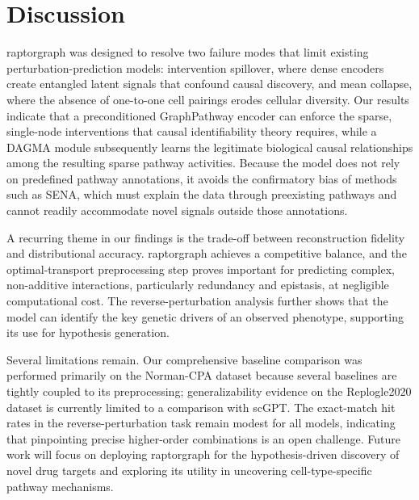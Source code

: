 \documentclass[10pt,letterpaper]{article}
\theoremstyle{definition}
\theoremstyle{remark}
\begin{document}
\section*{Discussion}
\gls{raptorgraph} was designed to resolve two failure modes that limit existing perturbation-prediction models: intervention spillover, where dense encoders create entangled latent signals that confound causal discovery, and mean collapse, where the absence of one-to-one cell pairings erodes cellular diversity.
Our results indicate that a preconditioned GraphPathway encoder can enforce the sparse, single-node interventions that causal identifiability theory requires, while a DAGMA module subsequently learns the legitimate biological causal relationships among the resulting sparse pathway activities.
Because the model does not rely on predefined pathway annotations, it avoids the confirmatory bias of methods such as SENA, which must explain the data through preexisting pathways and cannot readily accommodate novel signals outside those annotations.

A recurring theme in our findings is the trade-off between reconstruction fidelity and distributional accuracy. \gls{raptorgraph} achieves a competitive balance, and the optimal-transport preprocessing step proves important for predicting complex, non-additive interactions, particularly redundancy and epistasis, at negligible computational cost.
The reverse-perturbation analysis further shows that the model can identify the key genetic drivers of an observed phenotype, supporting its use for hypothesis generation.

Several limitations remain. Our comprehensive baseline comparison was performed primarily on the Norman-CPA dataset because several baselines are tightly coupled to its preprocessing; generalizability evidence on the Replogle2020 dataset is currently limited to a comparison with scGPT.
The exact-match hit rates in the reverse-perturbation task remain modest for all models, indicating that pinpointing precise higher-order combinations is an open challenge.
Future work will focus on deploying \gls{raptorgraph} for the hypothesis-driven discovery of novel drug targets and exploring its utility in uncovering cell-type-specific pathway mechanisms.


\end{document}
